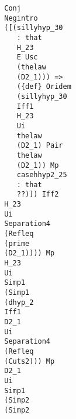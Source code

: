 \documentclass[12pt]{article}
\begin{document}
\begin{verbatim}
                                                    Conj 
                                                    Negintro 
                                                    ([(sillyhyp_30 
                                                       : that 
                                                       H_23 
                                                       E Usc 
                                                       (thelaw 
                                                       (D2_1))) => 
                                                       ({def} Oridem 
                                                       (sillyhyp_30 
                                                       Iff1 
                                                       H_23 
                                                       Ui 
                                                       thelaw 
                                                       (D2_1) Pair 
                                                       thelaw 
                                                       (D2_1)) Mp 
                                                       casehhyp2_25 
                                                       : that 
                                                       ??)]) Iff2 
                                                    H_23 
                                                    Ui 
                                                    Separation4 
                                                    (Refleq 
                                                    (prime 
                                                    (D2_1)))) Mp 
                                                    H_23 
                                                    Ui 
                                                    Simp1 
                                                    (Simp1 
                                                    (dhyp_2 
                                                    Iff1 
                                                    D2_1 
                                                    Ui 
                                                    Separation4 
                                                    (Refleq 
                                                    (Cuts2))) Mp 
                                                    D2_1 
                                                    Ui 
                                                    Simp1 
                                                    (Simp2 
                                                    (Simp2 

\end{verbatim}
\end{document}
